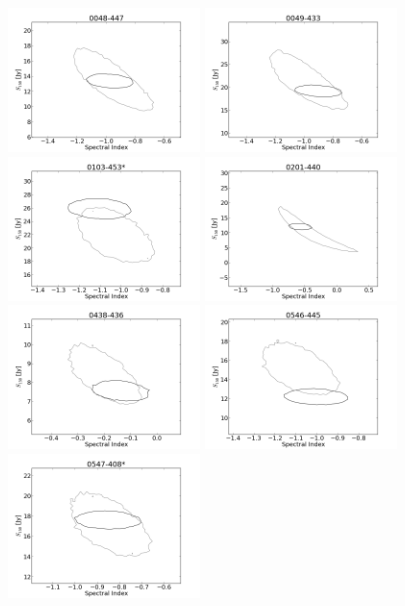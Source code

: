 \documentclass[preprint]{aastex}
\begin{document}
\begin{figure}[htbp]
\begin{center}
\includegraphics[width=2in]{plots/0048-447_SI_MCMC.png} %
\includegraphics[width=2in]{plots/0049-433_SI_MCMC.png} %
\includegraphics[width=2in]{plots/0103-453_SI_MCMC.png} %
\includegraphics[width=2in]{plots/0201-440_SI_MCMC.png} %
\includegraphics[width=2in]{plots/0438-436_SI_MCMC.png} %
\includegraphics[width=2in]{plots/0546-445_SI_MCMC.png} %
\includegraphics[width=2in]{plots/0547-408_SI_MCMC.png} %



\end{center}
\end{figure}
\end{document}
